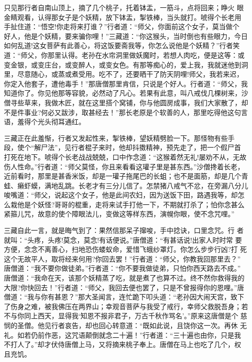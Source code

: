 只见那行者自南山顶上，摘了几个桃子，托着钵盂，一筋斗，点将回来；睁火
眼金睛观看，认得那女子是个妖精，放下钵盂，掣铁棒，当头就打。唬得个长老用
手扯住道：“悟空!你走将来打谁？”行者道：“师父，你面前这个女子，莫当做个
好人，他是个妖精，要来骗你哩！”三藏道：“你这猴头，当时倒也有些眼力，今日
如何乱道!这女菩萨有此善心，将这饭要斋我等，你怎么说他是个妖精？”行者笑
道：“师父，你那里认得。老孙在水帘洞里做妖魔时，若想人肉吃，便是这等：或
变金银，或变庄台，或变醉人，或变女色。有那等痴心的，爱上我，我就迷他到洞
里，尽意随心，或蒸或煮受用。吃不了，还要晒干了防天阴哩!师父，我若来迟，
你定入他套子，遭他毒手！”那唐僧那里肯信，只说是个好人。行者道：“师父，我
知道你了。你见他那等容貌，必然动了凡心。若果有此意，叫八戒伐几棵树来，沙
僧寻些草来，我做木匠，就在这里搭个窝铺，你与他圆房成事，我们大家散了，却
不是件事业?何必又跋涉，取甚经去！”那长老原是个软善的人，那里吃得他这句言
语，羞得个光头彻耳通红。

三藏正在此羞惭，行者又发起性来，掣铁棒，望妖精劈脸一下。那怪物有些手
段，使个“解尸法”，见行者棍子来时，他却抖擞精神，预先走了，把一个假尸首
打死在地下。唬得个长老战战兢兢，口中作念道：“这猴着然无礼!屡劝不从，无故
伤人性命。”行者道：“师父莫怪，你且来看看这瓘子里是甚东西。”沙僧搀着长老，
近前看时，那里是甚香米饭，却是一瓘子拖尾巴的长蛆；也不是面筋，却是几个青
蛙、癞虾蟆，满地乱跳。长老才有三分儿信了。怎禁猪八戒气不忿，在旁漏八分儿
唆嘴道：“师父，说起这个女子，他是此间农妇，因为送饭下田，路遇我等，却怎
么栽他是个妖怪?哥哥的棍重，走将来试手打他一下，不期就打杀了；怕你念甚么
紧箍儿咒，故意的使个障眼法儿，变做这等样东西，演幌你眼，使不念咒哩。”

三藏自此一言，就是晦气到了：果然信那呆子撺唆，手中捻诀，口里念咒。行
者就叫：“头疼，头疼!莫念，莫念!有话便说。”唐僧道：“有甚话说!出家人时时常
要方便，念念不离善心，扫地恐伤蝼蚁命，爱惜飞蛾纱罩灯。你怎么步步行凶?打
死这个无故平人，取将经来何用?你回去罢！”行者道：“师父，你教我回那里去？”
唐僧道：“我不要你做徒弟。”行者道：“你不要我做徒弟，只怕你西天路去不成。”
唐僧道：“我命在天，该那个妖精蒸了吃，就是煮了也算不过。终不然你救得我的
大限?你快回去！”行者道：“师父，我回去便也罢了，只是不曾报得你的恩哩。”唐
僧道：“我与你有甚恩？”那大圣闻言，连忙跪下叩头道：“老孙因大闹天宫，致下
了伤身之难，被我佛压在两界山；幸观音菩萨与我受了戒行，幸师父救脱吾身；若
不与你同上西天，显得我‘知恩不报非君子，万古千秋作骂名’。”原来这唐僧是个
慈悯的圣僧。他见行者哀告，却也回心转意道：“既如此说，且饶你这一次。再休
无礼。如若仍前作恶，这咒语颠倒就念二十遍！”行者道：“三十遍也由你，只是我
不打人了。”却才伏侍唐僧上马，又将摘来桃子奉上。唐僧在马上也吃了几个，权
且充饥。

